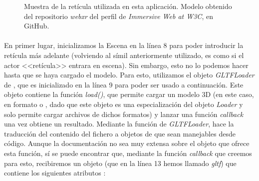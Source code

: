 \documentclass{subfiles}
\begin{document}
        \begin{figure}
        \centering
        \caption{Muestra de la retícula utilizada en esta aplicación. Modelo obtenido del repositorio \textit{webxr} del perfil de \textit{Immersive Web at W3C}, en GitHub.}
        \label{fig:reticle}
        \end{figure}

        \paragraph{}
        En primer lugar, inicializamos la Escena en la línea 8 para poder introducir la retícula más adelante (volviendo al símil anteriormente utilizado, es como si el actor <<retícula>> entrara en escena). Sin embargo, esto no lo podemos hacer hasta que se haya cargado el modelo. Para esto, utilizamos el objeto \textit{GLTFLoader} de \threejs \cite{web:threejs_gltfloader}, que es inicializado en la línea 9 para poder ser usado a continuación. Este objeto contiene la función \textit{load()}, que permite cargar un modelo 3D (en este caso, en formato \gltf o \glb, dado que este objeto es una especialización del objeto \textit{Loader} y solo permite cargar archivos de dichos formatos) y lanzar una función \textit{callback} una vez obtiene un resultado. Mediante la función de \textit{GLTFLoader}, \threejs hace la traducción del contenido del fichero a objetos de \threejs que sean manejables desde código. Aunque la documentación no sea muy extensa sobre el objeto que ofrece esta función, sí se puede encontrar que, mediante la función \textit{callback} que creemos para esto, recibiremos un objeto (que en la línea 13 hemos llamado \textit{gltf}) que contiene los siguientes atributos \cite{web:discoverthreejs}:
\end{document}
